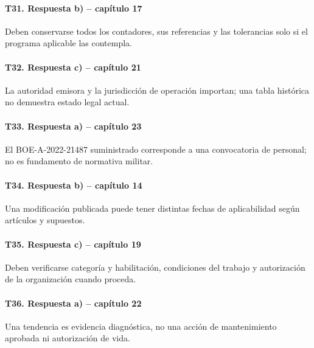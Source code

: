 \paragraph{T31. Respuesta b) -- capítulo 17} Deben conservarse todos los contadores, sus referencias y las tolerancias solo si el programa aplicable las contempla.

\paragraph{T32. Respuesta c) -- capítulo 21} La autoridad emisora y la jurisdicción de operación importan; una tabla histórica no demuestra estado legal actual.

\paragraph{T33. Respuesta a) -- capítulo 23} El BOE-A-2022-21487 suministrado corresponde a una convocatoria de personal; no es fundamento de normativa militar.

\paragraph{T34. Respuesta b) -- capítulo 14} Una modificación publicada puede tener distintas fechas de aplicabilidad según artículos y supuestos.

\paragraph{T35. Respuesta c) -- capítulo 19} Deben verificarse categoría y habilitación, condiciones del trabajo y autorización de la organización cuando proceda.

\paragraph{T36. Respuesta a) -- capítulo 22} Una tendencia es evidencia diagnóstica, no una acción de mantenimiento aprobada ni autorización de vida.


